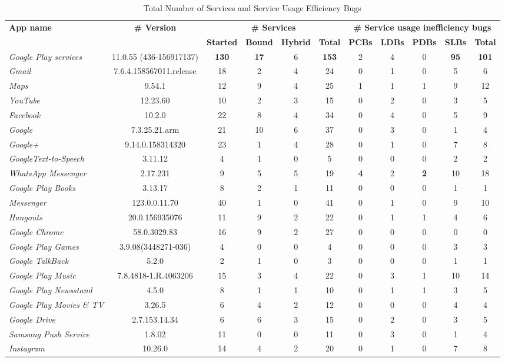 \documentclass[conference]{IEEEtran}
\begin{document}
\begin{table}
\centering
\footnotesize
\caption{Total Number of Services and Service Usage Efficiency Bugs}
\begin{tabular}{|l|c|cccc|ccccc|}\hline
{\bf App name}&\multicolumn{1}{|c|}{\textbf{\#  Version}}&\multicolumn{4}{|c|}{\textbf{\#  Services}} &\multicolumn{5}{|c|}{\textbf{\# Service usage inefficiency bugs}}\\
&{\bf }&{\bf Started}&{\bf Bound}&{\bf Hybrid} &{\bf Total} & {\bf PCBs}&{\bf LDBs}&{\bf PDBs} &{\bf SLBs}&{\bf Total}\\
\hline
\hline
{\it Google Play services}&11.0.55 (436-156917137)&{\bf 130}&{\bf 17}&6&{\bf 153}&2&4&0&{\bf 95}&{\bf 101}\\
{\it Gmail}&7.6.4.158567011.release&18&2&4&24&0&1&0&5&6\\
{\it Maps}&9.54.1&12&9&4&25&1&1&1&9&12\\
{\it YouTube}&12.23.60&10&2&3&15&0&2&0&3&5\\
{\it Facebook}&10.2.0&22&8&4&34&0&4&0&5&9\\
{\it Google}&7.3.25.21.arm&21&10&6&37&0&3&0&1&4\\
{\it Google+}&9.14.0.158314320&23&1&4&28&0&1&0&7&8\\
{\it GoogleText-to-Speech}&3.11.12&4&1&0&5&0&0&0&2&2\\
{\it WhatsApp Messenger}&2.17.231&9&5&5&19&{\bf 4}&2&{\bf 2}&10&18\\
{\it Google Play Books}&3.13.17&8&2&1&11&0&0&0&1&1\\
{\it Messenger}&123.0.0.11.70&40&1&0&41&0&1&0&9&10\\
{\it Hangouts}&20.0.156935076&11&9&2&22&0&1&1&4&6\\
{\it Google Chrome}&58.0.3029.83&16&9&2&27&0&0&0&0&0\\
{\it Google Play Games}&3.9.08(3448271-036)&4&0&0&4&0&0&0&3&3\\
{\it Google TalkBack}&5.2.0&2&1&0&3&0&0&0&1&1\\
{\it Google Play Music}&7.8.4818-1.R.4063206&15&3&4&22&0&3&1&10&14\\
{\it Google Play Newsstand}&4.5.0&8&1&1&10&0&1&1&3&5\\
{\it Google Play Movies \& TV}&3.26.5&6&4&2&12&0&0&0&4&4\\
{\it Google Drive}&2.7.153.14.34&6&6&3&15&0&2&0&3&5\\
{\it Samsung Push Service}&1.8.02&11&0&0&11&0&3&0&1&4\\
{\it Instagram}&10.26.0&14&4&2&20&0&1&0&7&8\\

\end{tabular}
\end{table}
\end{document}
